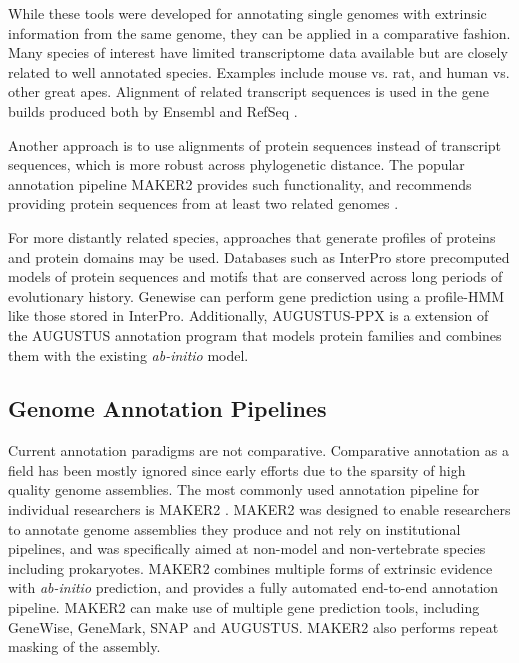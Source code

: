\documentclass[fleqn,10pt]{wlscirep}
\begin{document}
While these tools were developed for annotating single genomes with extrinsic information from the same genome, they can be applied in a comparative fashion. Many species of interest have limited transcriptome data available but are closely related to well annotated species. Examples include mouse vs. rat, and human vs. other great apes. Alignment of related transcript sequences is used in the gene builds produced both by Ensembl \cite{Aken01012016} and RefSeq \cite{pruitt2006ncbi}.

Another approach is to use alignments of protein sequences instead of transcript sequences, which is more robust across phylogenetic distance. The popular annotation pipeline MAKER2 \cite{cantarel2008maker} provides such functionality, and recommends providing protein sequences from at least two related genomes \cite{yandell2012beginner}. 

For more distantly related species, approaches that generate profiles of proteins and protein domains may be used. Databases such as InterPro \cite{zdobnov2001interproscan} store precomputed models of protein sequences and motifs that are conserved across long periods of evolutionary history. Genewise \cite{birney2004genewise} can perform gene prediction using a profile-HMM like those stored in InterPro. Additionally, AUGUSTUS-PPX \cite{keller2011novel} is a extension of the AUGUSTUS annotation program that models protein families and combines them with the existing \textit{ab-initio} model.

\subsection{Genome Annotation Pipelines}
Current annotation paradigms are not comparative. Comparative annotation as a field has been mostly ignored since early efforts due to the sparsity of high quality genome assemblies. The most commonly used annotation pipeline for individual researchers is MAKER2 \cite{cantarel2008maker}. MAKER2 was designed to enable researchers to annotate genome assemblies they produce and not rely on institutional pipelines, and was specifically aimed at non-model and non-vertebrate species including prokaryotes. MAKER2 combines multiple forms of extrinsic evidence with \textit{ab-initio} prediction, and provides a fully automated end-to-end annotation pipeline. MAKER2 can make use of multiple gene prediction tools, including GeneWise, GeneMark, SNAP and AUGUSTUS. MAKER2 also performs repeat masking of the assembly.
\end{document}
